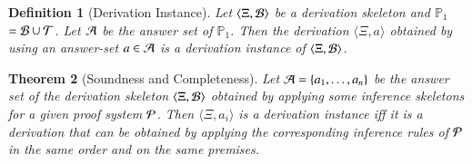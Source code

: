 \documentclass{new_tlp}
\newcommand{\elin}[2]{\ensuremath{{\tsl{unitctx}(\ensuremath{#1}, \ensuremath{#2})}}}
\newcommand{\emp}[1]{\ensuremath{{\tsl{emp}(\ensuremath{#1})}}}
\newcommand{\union}[3]{\ensuremath{{\tsl{union}(\ensuremath{#1},\ensuremath{#2},\ensuremath{ #3})}}}
\newcommand{\In}[2]{\ensuremath{\tsl{in}(\ensuremath{#1},\ensuremath{#2})}}
\newcommand\LPder{\ensuremath{\mathbb{P}_1}}
\newtheorem{theorem}{Theorem}
\newtheorem{definition}[theorem]{Definition}
\begin{document}
%
\begin{definition}[Derivation Instance]
Let $\langle \Xi, \Bscr \rangle$ be a derivation skeleton and \LPder\ $= \Bscr
\cup \Tscr$. Let $\Ascr$ be the answer set
of \LPder. Then the derivation $\langle \Xi, a \rangle$ obtained by using an answer-set 
$a \in \Ascr$ is a \emph{derivation instance} of $\langle \Xi, \Bscr \rangle$.
\end{definition}


\begin{theorem}[Soundness and Completeness]
Let $\Ascr = \{a_1, \ldots, a_n \}$ be the answer set of the derivation skeleton $\tup{\Xi, \Bscr}$ obtained
by applying some inference skeletons for a given proof system $\Pscr$. 
Then $\langle \Xi, a_i \rangle$ is a derivation instance iff it is a derivation
that can be obtained by applying the corresponding inference rules of $\Pscr$ in
the same order and on the same premises.
%
\end{theorem}
 
\end{document}
